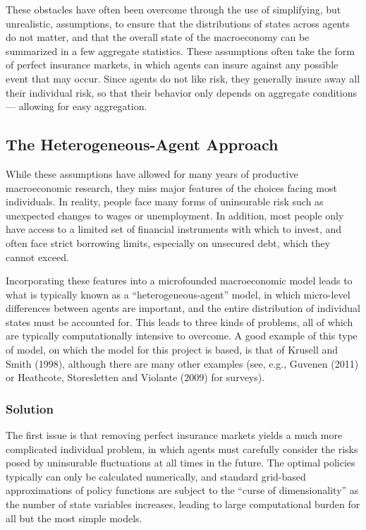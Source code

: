 \documentclass[a4paper,12pt]{article}
\numberwithin{equation}{section}
\theoremstyle{definition}
\begin{document}
These obstacles have often been overcome through the use of
simplifying, but unrealistic, assumptions, to ensure that the
distributions of states across agents do not matter, and that the
overall state of the macroeconomy can be summarized in a few aggregate
statistics. These assumptions often take the form of perfect insurance
markets, in which agents can insure against any possible event that
may occur. Since agents do not like risk, they generally insure away
all their individual risk, so that their behavior only depends on
aggregate conditions --- allowing for easy aggregation.

\subsection{The Heterogeneous-Agent Approach}

While these assumptions have allowed for many years of productive
macroeconomic research, they miss major features of the choices facing
most individuals. In reality, people face many forms of uninsurable
risk such as unexpected changes to wages or unemployment. In addition,
most people only have access to a limited set of financial instruments
with which to invest, and often face strict borrowing limits,
especially on unsecured debt, which they cannot exceed.

Incorporating these features into a microfounded macroeconomic model
leads to what is typically known as a ``heterogeneous-agent'' model,
in which micro-level differences between agents are important, and
the entire distribution of individual states must be accounted
for. This leads to three kinds of problems, all of which are
typically computationally intensive to overcome. A good example of
this type of model, on which the model for this project is based, is
that of Krusell and Smith (1998), although there are many other
examples (see, e.g., Guvenen (2011) or Heathcote, Storesletten and
Violante (2009) for surveys).

\subsubsection{Solution}

The first issue is that removing perfect insurance markets yields a
much more complicated individual problem, in which agents must
carefully consider the risks posed by uninsurable fluctuations at all
times in the future. The optimal policies typically can only be
calculated numerically, and standard grid-based approximations of
policy functions are subject to the ``curse of dimensionality'' as the
number of state variables increases, leading to large computational
burden for all but the most simple models.
\end{document}
